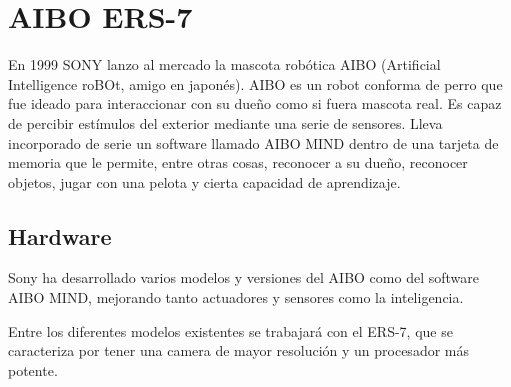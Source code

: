 \documentclass[12pt,a4paper,final,twoside]{book}
\begin{document}
\chapter{AIBO ERS-7}\label{secaibo}
\thispagestyle{fancy}
En 1999 SONY lanzo al mercado la mascota robótica AIBO (Artificial Intelligence roBOt, amigo en japonés). AIBO es un robot conforma de perro que fue ideado para interaccionar con su dueño como si fuera mascota real. Es capaz de percibir estímulos del exterior mediante una serie de sensores. Lleva incorporado de serie un software llamado AIBO MIND dentro de una tarjeta de memoria que le permite, entre otras cosas, reconocer a su dueño, reconocer objetos, jugar con una pelota y cierta capacidad de aprendizaje.


\section{Hardware}
Sony ha desarrollado varios modelos y versiones del AIBO como del software AIBO MIND, mejorando tanto actuadores y sensores como la inteligencia.

Entre los diferentes modelos existentes se trabajará con el ERS-7, que se caracteriza por tener una camera de mayor resolución y un procesador más potente.
\end{document}
